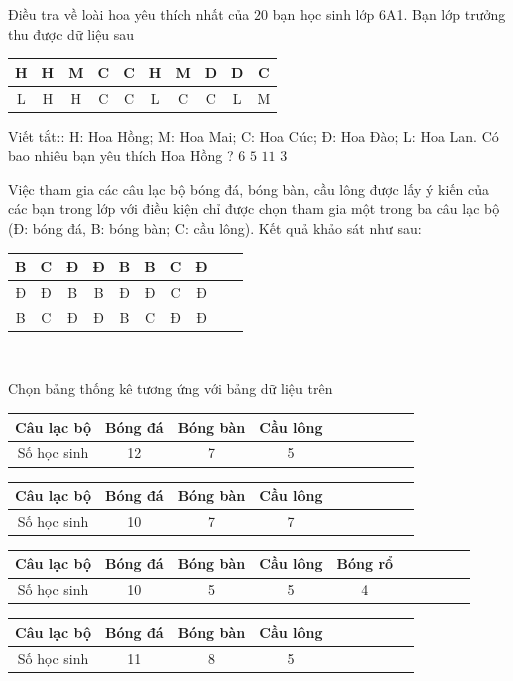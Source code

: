 \begin{ex}
	Điều tra về loài hoa yêu thích nhất của $ 20 $ bạn học sinh lớp 6A1. Bạn lớp trưởng thu được dữ liệu sau
	\begin{center}
		\begin{tabular}{|c|c|c|c|c|c|c|c|c|c|}
			\hline H & H & M & C & C & H & M & D & D & C \\
			\hline L & H & H & C & C & L & C & C & L & M \\
			\hline
		\end{tabular}
	\end{center}
	Viết tắt:: H: Hoa Hồng; M: Hoa Mai; C: Hoa Cúc; Đ: Hoa Đào; L: Hoa Lan. Có bao nhiêu bạn yêu thích Hoa Hồng ?
	\choice
	{$ 6 $}
	{\True $ 5 $}
	{$ 11 $}
	{$ 3 $}
\end{ex}

\begin{ex} Việc tham gia các câu lạc bộ bóng đá, bóng bàn, cầu lông được lấy ý kiến của các bạn trong lớp với điều kiện chỉ được chọn tham gia một trong ba câu lạc bộ (Đ: bóng đá, B: bóng bàn; C: cầu lông). Kết quả khảo sát như sau:
	\begin{center}
		\begin{tabular}{|c|c|c|c|c|c|c|c|c|c|}\hline
			B&C&Đ&Đ&B&B&C&Đ\\ \hline
			Đ&Đ&B&B&Đ&Đ&C&Đ\\ \hline
			B&C&Đ&Đ&B&C&Đ&Đ\\ \hline
		\end{tabular}\\
	\end{center}
	Chọn bảng thống kê tương ứng với bảng dữ liệu trên
	\choice
	{\True \begin{tabular}{|c|c|c|c|c|c|c|c|c|c|}\hline
			Câu lạc bộ&Bóng đá&Bóng bàn&Cầu lông\\ \hline
			Số học sinh&12&7&5\\ \hline
	\end{tabular} }
	{ \begin{tabular}{|c|c|c|c|c|c|c|c|c|c|}\hline
			Câu lạc bộ&Bóng đá&Bóng bàn&Cầu lông\\ \hline
			Số học sinh&10&7&7\\ \hline
	\end{tabular} }
	{ \begin{tabular}{|c|c|c|c|c|c|c|c|c|c|}\hline
			Câu lạc bộ&Bóng đá&Bóng bàn&Cầu lông&Bóng rổ\\ \hline
			Số học sinh&10&5&5&4\\ \hline
	\end{tabular}}
	{ \begin{tabular}{|c|c|c|c|c|c|c|c|c|c|}\hline
			Câu lạc bộ&Bóng đá&Bóng bàn&Cầu lông\\ \hline
			Số học sinh&11&8&5\\ \hline
	\end{tabular}}
\end{ex}


